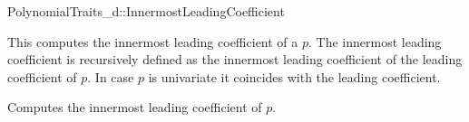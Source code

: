 \begin{ccRefConcept}{PolynomialTraits_d::InnermostLeadingCoefficient}

\ccDefinition

This  computes the innermost leading coefficient
of a  $p$. The innermost leading coefficient is recursively defined as the innermost leading coefficient of the leading coefficient of $p$. In case $p$ is univariate it coincides with the leading coefficient. 

\ccRefines 
{}

\ccTypes
{}
\ccGlue
{}
\ccGlue

\ccOperations
{}
         {Computes the innermost leading coefficient of $p$.}

 
\ccSeeAlso

\\

\end{ccRefConcept}
